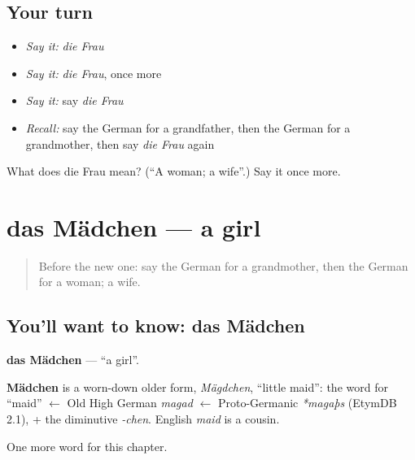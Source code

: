 \subsection*{Your turn}
\begin{itemize}
\raggedright
  \item \emph{Say it:} \emph{die Frau}
  \item \emph{Say it:} \emph{die Frau}, once more
  \item \emph{Say it:} say \emph{die Frau}
  \item \emph{Recall:} say the German for a grandfather, then the German for a grandmother, then say \emph{die Frau} again
\end{itemize}

\begin{tcolorbox}[breakable,colback=teal!4,colframe=teal!35!black,title={Before you move on}]
What does die Frau mean? (\textquotedblleft{}A woman; a wife\textquotedblright{}.) Say it once more.
\end{tcolorbox}
\section[das Mädchen]{das Mädchen — a girl}

\label{lesson:GE-C62-maedchen}



\begin{quote}
Before the new one: say the German for a grandmother, then the German for a woman; a wife.
\end{quote}

\subsection*{You'll want to know: das Mädchen}
\textbf{das Mädchen} — \textquotedblleft{}a girl\textquotedblright{}.

\begin{cousinweb}
\textbf{Mädchen} is a worn-down older form, \emph{Mägdchen}, \textquotedblleft{}little maid\textquotedblright{}: the word for \textquotedblleft{}maid\textquotedblright{} $\leftarrow$ Old High German \emph{magad} $\leftarrow$ Proto-Germanic \emph{*magaþs} (EtymDB 2.1), + the diminutive \emph{-chen}. English \emph{maid} is a cousin.
\end{cousinweb}

\begin{grammarlens}[title={What you've built}]
One more word for this chapter.
\end{grammarlens}


